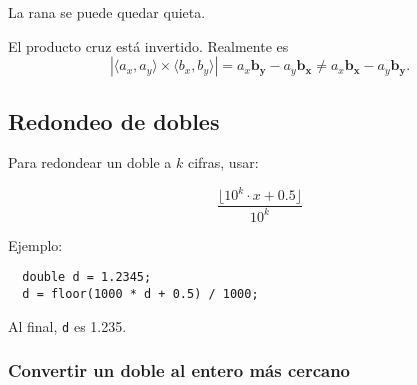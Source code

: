 \documentclass[10pt,letterpaper,twocolumn]{article}
\begin{document}
\begin{itemize}
  \begin{item}
    La rana se puede quedar quieta.
  \end{item}
  
  \begin{item}
    El producto cruz está invertido. Realmente es $$|\langle a_x, a_y \rangle \times \langle b_x, b_y\rangle| = a_x \mathbf{b_y} - a_y \mathbf{b_x} \neq a_x \mathbf{b_x} - a_y \mathbf{b_y}. $$
  \end{item}
\end{itemize}

\subsection{Redondeo de dobles}

Para redondear un doble a $k$ cifras, usar:

$$ \dfrac{\lfloor 10^{k} \cdot x + 0.5 \rfloor }{10^k} $$

Ejemplo:
\begin{verbatim}
  double d = 1.2345;
  d = floor(1000 * d + 0.5) / 1000;
\end{verbatim}

Al final, \verb_d_ es 1.235.

\subsubsection{Convertir un doble al entero más cercano}
\end{document}
